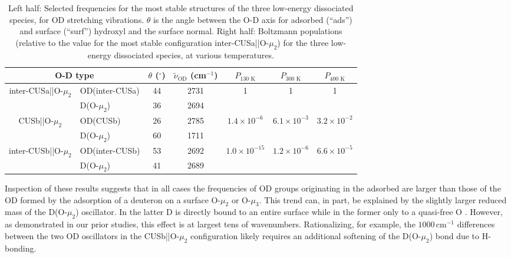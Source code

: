 \documentclass[twoside,twocolumn,9pt]{article}
\begin{document}
\begin{table*}[hbt]
  \centering
  \caption{Left half: Selected frequencies for the most stable structures of the three low-energy dissociated species, for OD stretching vibrations. $\theta$ is the angle between the O-D axis for adsorbed (``ads'') and surface (``surf'') hydroxyl and the surface normal. Right half: Boltzmann populations (relative to the value for the most stable configuration inter-CUSa||O-$\mu_2$) for the three low-energy dissociated species, at various temperatures.
}
  \begin{tabular}{cl|cc|ccc}
   \multicolumn{2}{c|}{O-D type} & $\theta$ ($^{\circ}$) &  $\tilde{\nu}_{\textrm{OD}}$ (cm$^{-1}$) & $P_\text{130 K}$ & $P_\text{300 K}$ & $P_\text{400 K}$\\
    \hline
\multirow{2}{*}{inter-CUSa||O-$\mu_2$} & OD(inter-CUSa)   &44 & 2731 & \multirow{2}{*}{1} & \multirow{2}{*}{1} & \multirow{2}{*}{1}\\ %
 & D(O-$\mu_2$)   &36 & 2694 & & & \\
\hline
\multirow{2}{*}{CUSb||O-$\mu_2$} &  OD(CUSb) & 26 & 2785 & \multirow{2}{*}{$1.4 \times 10^{-6}$} & \multirow{2}{*}{$6.1 \times 10^{-3}$} & \multirow{2}{*}{$3.2 \times 10^{-2}$} \\ %
& D(O-$\mu_2$) &60 &  1711 & & & \\
\hline
 \multirow{2}{*}{inter-CUSb||O-$\mu_2$} & OD(inter-CUSb) &53 &  2692 & \multirow{2}{*}{$1.0 \times 10^{-15}$} & \multirow{2}{*}{$1.2 \times 10^{-6}$} & \multirow{2}{*}{$6.6 \times 10^{-5}$}\\ %
 & D(O-$\mu_2$)    &41 &  2689 & & & 
  \end{tabular}
\label{tab:frequencies}
\end{table*}

Inspection of these results suggests that in all cases the frequencies of OD groups originating in the adsorbed  are larger than those of the OD formed by the adsorption of a deuteron on a surface O-$\mu_2$ or O-$\mu_3$. This trend can, in part, be explained by the slightly larger reduced mass of the D(O-$\mu_{2}$) oscillator. In the latter D is directly bound to an entire surface while in the former only to a quasi-free O \cite{kirsch2014}. However, as demonstrated in our prior studies, this effect is at largest tens of wavenumbers. Rationalizing, for example, the $1000\,$cm$^{-1}$ differences between the two OD oscillators in the CUSb||O-$\mu_2$ configuration likely requires an additional softening of the D(O-$\mu_{2}$) bond due to H-bonding.
\end{document}
